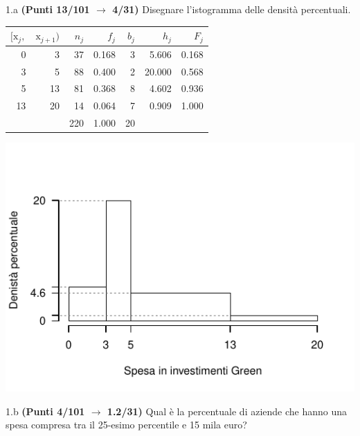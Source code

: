 \documentclass[
  11pt,
]{book}
\theoremstyle{mytheoremstyle}
\theoremstyle{mydefstyle}
\newenvironment{sol}
  {
  \begin{tcolorbox}[enhanced,breakable,arc=0.1mm,boxrule=1pt,colback=white,colframe=iblue,
  title=\bf \fontfamily{lmss}\selectfont \hspace{.5 cm} Soluzione,drop fuzzy shadow]

}{
\end{tcolorbox}
  }
\begin{document}
1.a \textbf{(Punti 13/101 \(\rightarrow\) 4/31)} Disegnare l'istogramma delle densità percentuali.

\begin{sol}

\begin{table}[H]
\centering
\begin{tabular}{rrrrrrr}
\toprule
$[\text{x}_j,$ & $\text{x}_{j+1})$ & $n_j$ & $f_j$ & $b_j$ & $h_j$ & $F_j$\\
\midrule
0 & 3 & 37 & 0.168 & 3 & 5.606 & 0.168\\
3 & 5 & 88 & 0.400 & 2 & 20.000 & 0.568\\
5 & 13 & 81 & 0.368 & 8 & 4.602 & 0.936\\
13 & 20 & 14 & 0.064 & 7 & 0.909 & 1.000\\
 &  & 220 & 1.000 & 20 &  & \\
\bottomrule
\end{tabular}
\end{table}

\begin{center}\includegraphics{Esami_passati_con_soluzioni_files/figure-latex/2022-68-1} \end{center}

\end{sol}

1.b \textbf{(Punti 4/101 \(\rightarrow\) 1.2/31)} Qual è la percentuale di aziende che hanno una spesa
compresa tra il 25-esimo percentile e 15 mila euro?
\end{document}
